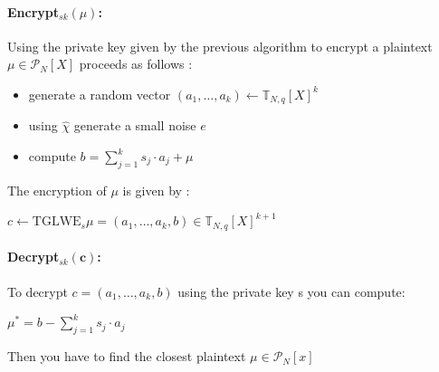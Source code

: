 \documentclass{article}
\newcommand{\T}{\mathbb{T}}
\newcommand{\Pcal}{\mathcal{P}}
\theoremstyle{definition}
\theoremstyle{Theorem}
\begin{document}
\paragraph{Encrypt$_{sk}(\mu)$:}

Using the private key given by the previous algorithm to encrypt a plaintext $\mu \in \Pcal_N[X]$ proceeds as follows :
\begin{itemize}
\item generate a random vector $(a_1, \dots, a_k)\leftarrow\T_{N,q}[X]^k$
\item using $\hat\chi$ generate a small noise $e$
\item compute $b=\sum_{j=1}^k s_j\cdot a_j + \mu$
\end{itemize}

The encryption of $\mu$ is given by :

$c\leftarrow\text{TGLWE}_s{\mu}=(a_1, \dots, a_k, b) \in \T_{N,q}[X]^{k+1}$

\paragraph{Decrypt$_{sk}(\mathbf{c})$:}

To decrypt $c = (a_1, \dots, a_k, b)$ using the private key s you can compute:

    $\mu^{*} = b - \sum_{j=1}^k s_j\cdot a_j$

Then you have to find the closest plaintext $\mu \in \Pcal_N[x]$




\end{document}
